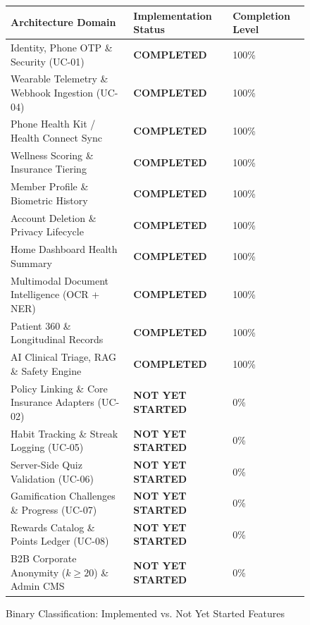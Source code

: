 \documentclass[11pt,a4paper]{article}
\begin{document}
\begin{figure}[htbp]
    \centering
    \begin{tcolorbox}[colback=white,colframe=primaryblue,arc=2mm,title=High-Level Implementation Status Breakdown]
        \begin{tabular}{p{6.5cm} p{4.5cm} p{3.5cm}}
            \textbf{Architecture Domain} & \textbf{Implementation Status} & \textbf{Completion Level} \\
            \midrule
            Identity, Phone OTP \& Security (UC-01) & \textcolor{statuscompleted}{\textbf{COMPLETED}} & 100\% \\
            Wearable Telemetry \& Webhook Ingestion (UC-04) & \textcolor{statuscompleted}{\textbf{COMPLETED}} & 100\% \\
            Phone Health Kit / Health Connect Sync & \textcolor{statuscompleted}{\textbf{COMPLETED}} & 100\% \\
            Wellness Scoring \& Insurance Tiering & \textcolor{statuscompleted}{\textbf{COMPLETED}} & 100\% \\
            Member Profile \& Biometric History & \textcolor{statuscompleted}{\textbf{COMPLETED}} & 100\% \\
            Account Deletion \& Privacy Lifecycle & \textcolor{statuscompleted}{\textbf{COMPLETED}} & 100\% \\
            Home Dashboard Health Summary & \textcolor{statuscompleted}{\textbf{COMPLETED}} & 100\% \\
            Multimodal Document Intelligence (OCR + NER) & \textcolor{statuscompleted}{\textbf{COMPLETED}} & 100\% \\
            Patient 360 \& Longitudinal Records & \textcolor{statuscompleted}{\textbf{COMPLETED}} & 100\% \\
            AI Clinical Triage, RAG \& Safety Engine & \textcolor{statuscompleted}{\textbf{COMPLETED}} & 100\% \\
            \midrule
            Policy Linking \& Core Insurance Adapters (UC-02) & \textcolor{statusnotstarted}{\textbf{NOT YET STARTED}} & 0\% \\
            Habit Tracking \& Streak Logging (UC-05) & \textcolor{statusnotstarted}{\textbf{NOT YET STARTED}} & 0\% \\
            Server-Side Quiz Validation (UC-06) & \textcolor{statusnotstarted}{\textbf{NOT YET STARTED}} & 0\% \\
            Gamification Challenges \& Progress (UC-07) & \textcolor{statusnotstarted}{\textbf{NOT YET STARTED}} & 0\% \\
            Rewards Catalog \& Points Ledger (UC-08) & \textcolor{statusnotstarted}{\textbf{NOT YET STARTED}} & 0\% \\
            B2B Corporate Anonymity ($k \ge 20$) \& Admin CMS & \textcolor{statusnotstarted}{\textbf{NOT YET STARTED}} & 0\% \\
            \bottomrule
        \end{tabular}
    \end{tcolorbox}
    \caption{Binary Classification: Implemented vs. Not Yet Started Features}
\end{figure}
\end{document}
